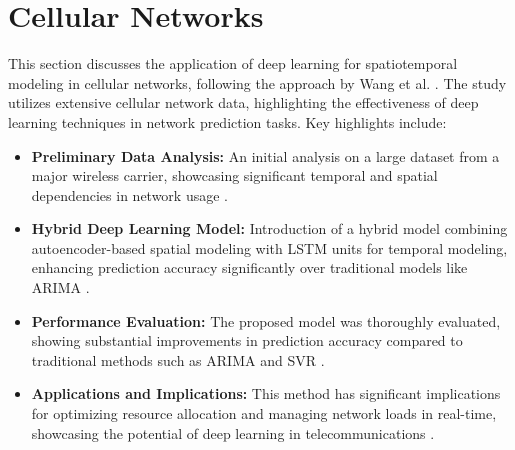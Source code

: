 \section{Cellular Networks}

This section discusses the application of deep learning for spatiotemporal modeling in cellular networks, following the approach by Wang et al. \cite{Wang2017Spatiotemporal}. The study utilizes extensive cellular network data, highlighting the effectiveness of deep learning techniques in network prediction tasks. Key highlights include:

\begin{itemize}
    \item \textbf{Preliminary Data Analysis:} An initial analysis on a large dataset from a major wireless carrier, showcasing significant temporal and spatial dependencies in network usage \cite{Wang2017Spatiotemporal, Zhang2017Spatiotemporal}.
    
    \item \textbf{Hybrid Deep Learning Model:} Introduction of a hybrid model combining autoencoder-based spatial modeling with LSTM units for temporal modeling, enhancing prediction accuracy significantly over traditional models like ARIMA \cite{Wang2017Spatiotemporal, Hochreiter1997, Box2015ARIMA}.
    
    \item \textbf{Performance Evaluation:} The proposed model was thoroughly evaluated, showing substantial improvements in prediction accuracy compared to traditional methods such as ARIMA and SVR \cite{Wang2017Spatiotemporal, Drucker1997SVR}.
    
    \item \textbf{Applications and Implications:} This method has significant implications for optimizing resource allocation and managing network loads in real-time, showcasing the potential of deep learning in telecommunications \cite{Wang2017Spatiotemporal, Goodfellow2016DeepLearning}.
\end{itemize}
